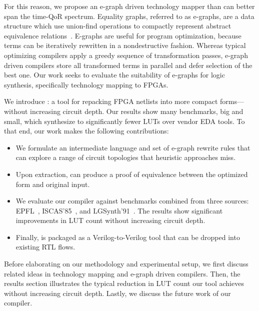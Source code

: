 For this reason, we propose an e-graph driven technology mapper than can better
span the time-QoR spectrum. Equality graphs, referred to as e-graphs, are a
data structure which use union-find operations to compactly represent abstract
equivalence relations~\cite{eggpaper}. E-graphs are useful for program
optimization, because terms can be iteratively rewritten in a nondestructive
fashion. Whereas typical optimizing compilers apply a greedy sequence of
transformation passes, e-graph driven compilers store all transformed terms in
parallel and defer selection of the best one. Our work seeks to evaluate the
suitability of e-graphs for logic synthesis, specifically technology mapping to
FPGAs.

We introduce \shortname{}: a tool for repacking FPGA netlists into more compact
forms---without increasing circuit depth. Our results show many benchmarks, big
and small, which synthesize to significantly fewer LUTs over vendor EDA tools.
To that end, our work makes the following contributions:

\begin{itemize}
    \item We formulate an intermediate language and set of e-graph rewrite rules that can
          explore a range of circuit topologies that heuristic approaches miss.
    \item Upon extraction, \shortname{} can produce a proof of equivalence between the
          optimized form and original input.
    \item We evaluate our compiler against \nbenchmarks{} benchmarks combined from three
          sources: EPFL~\cite{epflbench}, ISCAS'85~\cite{iscasbench}, and
          LGSynth'91~\cite{lgsynthbench}. The results show significant improvements in
          LUT count without increasing circuit depth.
    \item Finally, \shortname{} is packaged as a Verilog-to-Verilog tool that can be
          dropped into existing RTL flows.
\end{itemize}

Before elaborating on our methodology and experimental setup, we first discuss
related ideas in technology mapping and e-graph driven compilers. Then, the
results section illustrates the typical reduction in LUT count our tool
achieves without increasing circuit depth. Lastly, we discuss the future work
of our compiler.